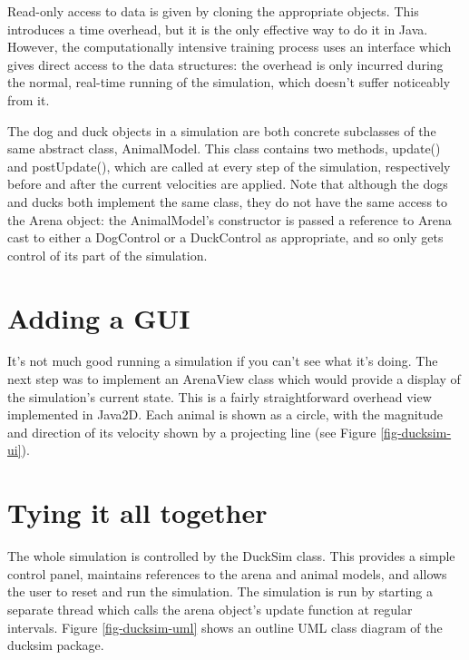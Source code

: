 \documentclass[a4paper]{report}
\newcommand{\code}[1]{{\ttfamily #1}}
\begin{document}
Read-only access to data is given by cloning the appropriate objects.
This introduces a time overhead, but it is the only effective way to
do it in Java. However, the computationally intensive training process
uses an interface which gives direct access to the data structures:
the overhead is only incurred during the normal, real-time running of
the simulation, which doesn't suffer noticeably from it.

The dog and duck objects in a simulation are both concrete subclasses
of the same abstract class, \code{AnimalModel}. This class contains
two methods, \code{update()} and \code{postUpdate()}, which are called
at every step of the simulation, respectively before and after the
current velocities are applied. Note that although the dogs and ducks
both implement the same class, they do not have the same access to the
\code{Arena} object: the \code{AnimalModel}'s constructor is passed
a reference to \code{Arena} cast to either a \code{DogControl} or a
\code{DuckControl} as appropriate, and so only gets control of its
part of the simulation.

\section{Adding a GUI}

It's not much good running a simulation if you can't see what it's
doing. The next step was to implement an \code{ArenaView} class which
would provide a display of the simulation's current state. This is a
fairly straightforward overhead view implemented in Java2D.
Each animal is shown as a circle, with the magnitude and direction of
its velocity shown by a projecting line (see Figure \ref{fig-ducksim-ui}).

\section{Tying it all together}

The whole simulation is controlled by the \code{DuckSim} class. This
provides a simple control panel, maintains references to the arena and
animal models, and allows the user to reset and run the simulation.
The simulation is run by starting a separate thread which calls the
arena object's update function at regular intervals. Figure
\ref{fig-ducksim-uml} shows an outline UML class diagram of the
\code{ducksim} package.
\end{document}
